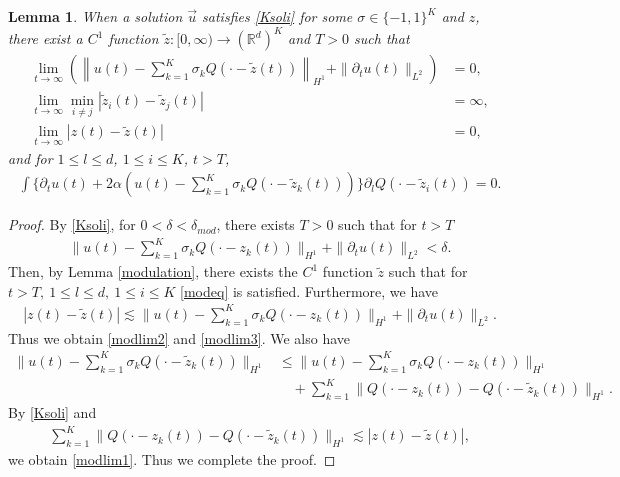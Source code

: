 \documentclass[reqno]{amsart}
\theoremstyle{plain}
\newtheorem{lemma}[theorem]{Lemma}
\theoremstyle{definition}
\numberwithin{equation}{section}
\newcommand{\1}{\mathbbm{1}}
\begin{document}
\begin{lemma}\label{modKsoli}
When a solution $\vec{u}$ satisfies \eqref{Ksoli} for some $\sigma \in \{-1,1\}^K$ and $z$, there exist a $C^1$ function $\tilde{z}:[0,\infty)\to (\mathbb{R}^d)^K$ and $T>0$ such that 
\begin{align}
\lim_{t\to\infty}(\left\| u(t)-\sum_{k=1}^K \sigma_kQ(\cdot-\tilde{z}(t))\right\|_{H^1}+\|{\partial}_tu(t)\|_{L^2})&=0,\label{modlim1}
\\
\lim_{t\to\infty} \min_{i\neq j}|\tilde{z}_i(t)-\tilde{z}_j(t)|&=\infty,\label{modlim2}
\\
\lim_{t\to\infty} |z(t)-\tilde{z}(t)|&=0,\label{modlim3}
\end{align}
and for $1\leq l\leq d$, $1\leq i\leq K$, $t>T$,
\begin{align}\label{modeq}
\int \{ {\partial}_tu(t)+2\alpha(u(t)-\sum_{k=1}^K \sigma_k Q(\cdot-\tilde{z}_k(t)))\} {\partial}_lQ(\cdot-\tilde{z}_i(t))=0.
\end{align}
\end{lemma}

\begin{proof}
By \eqref{Ksoli}, for $0<\delta<\delta_{mod}$, there exists $T>0$ such that for $t>T$
\begin{align*}
\| u(t)-\sum_{k=1}^K \sigma_kQ(\cdot-z_k(t))\|_{H^1}+\|{\partial}_tu(t)\|_{L^2}<\delta.
\end{align*}
Then, by Lemma \ref{modulation}, there exists the $C^1$ function $\tilde{z}$ such that for $t>T,\ 1\leq l\leq d,\ 1\leq i\leq K$ \eqref{modeq} is satisfied. Furthermore, we have
\begin{align*}
|z(t)-\tilde{z}(t)|\lesssim  \|u(t)-\sum_{k=1}^K \sigma_kQ(\cdot-z_k(t))\|_{H^1}+\|{\partial}_tu(t)\|_{L^2}.
\end{align*}
Thus we obtain \eqref{modlim2} and \eqref{modlim3}. We also have
\begin{align*}
\| u(t)-\sum_{k=1}^K \sigma_kQ(\cdot-\tilde{z}_k(t))\|_{H^1}&\leq \| u(t)-\sum_{k=1}^K \sigma_kQ(\cdot-z_k(t))\|_{H^1}
\\
&\quad +\sum_{k=1}^K\|Q(\cdot-z_k(t))-Q(\cdot-\tilde{z}_k(t))\|_{H^1}.
\end{align*}
By \eqref{Ksoli} and 
\begin{align*}
\sum_{k=1}^K\|Q(\cdot-z_k(t))-Q(\cdot-\tilde{z}_k(t))\|_{H^1}\lesssim |z(t)-\tilde{z}(t)|,
\end{align*}
we obtain \eqref{modlim1}. Thus we complete the proof.
\end{proof}
\end{document}
